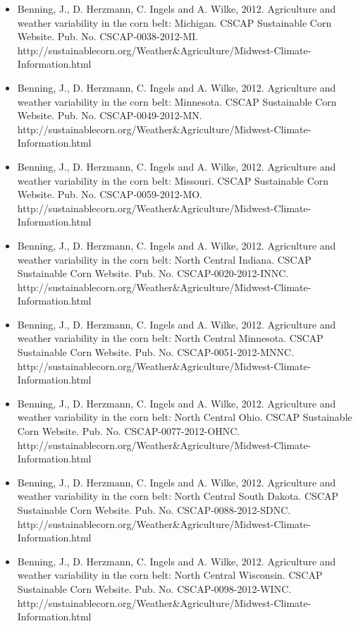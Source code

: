 \begin{itemize}
\item Benning, J., D. Herzmann, C. Ingels and A. Wilke, 2012. Agriculture and weather variability in the corn belt: Michigan. CSCAP Sustainable Corn Website. Pub. No. CSCAP-0038-2012-MI. http://sustainablecorn.org/Weather\&Agriculture/Midwest-Climate-Information.html

\item Benning, J., D. Herzmann, C. Ingels and A. Wilke, 2012. Agriculture and weather variability in the corn belt: Minnesota. CSCAP Sustainable Corn Website. Pub. No. CSCAP-0049-2012-MN. http://sustainablecorn.org/Weather\&Agriculture/Midwest-Climate-Information.html

\item Benning, J., D. Herzmann, C. Ingels and A. Wilke, 2012. Agriculture and weather variability in the corn belt: Missouri. CSCAP Sustainable Corn Website. Pub. No. CSCAP-0059-2012-MO. http://sustainablecorn.org/Weather\&Agriculture/Midwest-Climate-Information.html

\item Benning, J., D. Herzmann, C. Ingels and A. Wilke, 2012. Agriculture and weather variability in the corn belt: North Central Indiana. CSCAP Sustainable Corn Website. Pub. No. CSCAP-0020-2012-INNC. http://sustainablecorn.org/Weather\&Agriculture/Midwest-Climate-Information.html

\item Benning, J., D. Herzmann, C. Ingels and A. Wilke, 2012. Agriculture and weather variability in the corn belt: North Central Minnesota. CSCAP Sustainable Corn Website. Pub. No. CSCAP-0051-2012-MNNC. http://sustainablecorn.org/Weather\&Agriculture/Midwest-Climate-Information.html

\item Benning, J., D. Herzmann, C. Ingels and A. Wilke, 2012. Agriculture and weather variability in the corn belt: North Central Ohio. CSCAP Sustainable Corn Website. Pub. No. CSCAP-0077-2012-OHNC. http://sustainablecorn.org/Weather\&Agriculture/Midwest-Climate-Information.html

\item Benning, J., D. Herzmann, C. Ingels and A. Wilke, 2012. Agriculture and weather variability in the corn belt: North Central South Dakota. CSCAP Sustainable Corn Website. Pub. No. CSCAP-0088-2012-SDNC. http://sustainablecorn.org/Weather\&Agriculture/Midwest-Climate-Information.html

\item Benning, J., D. Herzmann, C. Ingels and A. Wilke, 2012. Agriculture and weather variability in the corn belt: North Central Wisconsin. CSCAP Sustainable Corn Website. Pub. No. CSCAP-0098-2012-WINC. http://sustainablecorn.org/Weather\&Agriculture/Midwest-Climate-Information.html


\end{itemize}

